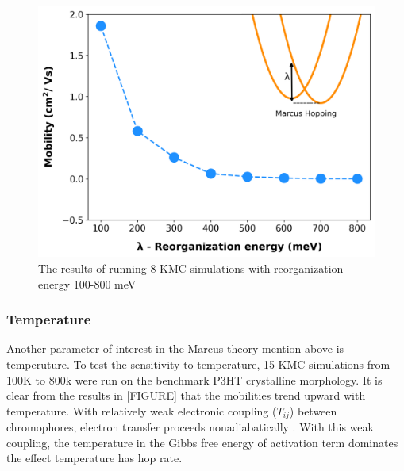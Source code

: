 \begin{figure}
  \center
  \includegraphics[width=0.8\linewidth]{figures/reorg.png} 
    \caption{The results of running 8 KMC simulations with reorganization energy 100-800 meV}
  \label{fig:reorg}
\end{figure}

\subsubsection{Temperature}

Another parameter of interest in the Marcus theory mention above is temperuture. To test the sensitivity to
temperature, 15 KMC simulations from 100K to 800k were run on the benchmark P3HT crystalline morphology. It
is clear from the results in [FIGURE] that the mobilities trend upward with temperature. With relatively
weak electronic coupling ($T_{ij}$) between chromophores, electron transfer proceeds nonadiabatically
\cite{clarke2010}. With this weak coupling, the temperature in the Gibbs free energy of activation term
dominates the effect temperature has hop rate. 

